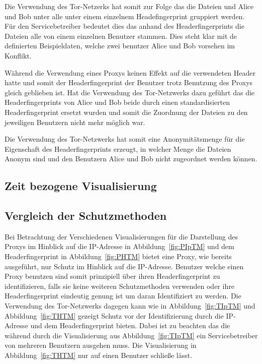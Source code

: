 \documentclass[
    fontsize=12pt,
    headings=small,
    parskip=half,           %
    bibliography=totoc,
    numbers=noenddot,       %
    open=any,               %
    ]{scrreprt}
\begin{document}
Die Verwendung des Tor-Netzerks hat somit zur Folge das die Dateien und Alice und Bob unter alle unter einem einzelnem Headefingerprint gruppiert werden. 
Für den Servicebetreiber bedeutet dies das anhand des Headerfingerprints die Dateien alle von einem einzelnen Benutzer stammen. 
Dies steht klar mit de definierten Beispieldaten, welche zwei benutzer Alice und Bob vorsehen im Konflikt.

Während die Verwendung eines Proxys keinen Effekt auf die verwendeten Header hatte und somit der Headerfingerprint der Benutzer trotz Benutzung des Proxys gleich geblieben ist. 
Hat die Verwendung des Tor-Netzwerks dazu geführt das die Headerfingerprints von Alice und Bob beide durch einen standardisierten Headerfingerprint ersetzt wurden und somit die Zuordnung der Dateien zu den jeweiligen Benutzern nicht mehr möglich war.

Die Verwendung des Tor-Netzwerks hat somit eine Anonymitätsmenge für die Eigenschaft des Headerfingerprints erzeugt, in welcher Menge die Dateien Anonym sind und den Benutzern Alice und Bob nicht zugeordnet werden können.


    
    \subsection{Zeit bezogene Visualisierung}
    
    
    
    \subsection{Vergleich der Schutzmethoden}
Bei Betrachtung der Verschiedenen Visualisierungen für die Darstellung des Proxys im Hinblick auf die IP-Adresse in Abbildung~\ref{fig:PIpTM} und dem Headerfingerprint in Abbildung~\ref{fig:PHTM} bietet eine Proxy, wie bereits ausgeführt, nur Schutz im Hinblick auf die IP-Adresse.
Benutzer welche einen Proxy benutzen sind somit prinzipiell über ihren Headerfingerprint zu identifizieren, falls sie keine weiteren Schutzmethoden verwenden oder ihre Headerfingerprint eindeutig genung ist um daran Identifiziert zu werden. 
Die Verwendung des Tor-Netzwerks dagegen kann wie in Abbildung~\ref{fig:TIpTM} und Abbildung~\ref{fig:THTM} gezeigt Schutz vor der Identifizierung durch die IP-Adresse und dem Headerfingerprint bieten.
Dabei ist zu beachten das die während durch die Visualisierung aus Abbildung~\ref{fig:TIpTM} ein Servicebetreiber von mehreren Benutzern ausgehen muss.
Die Visualisierung in Abbildung~\ref{fig:THTM} nur auf einen Benutzer schließe lässt.
\end{document}
